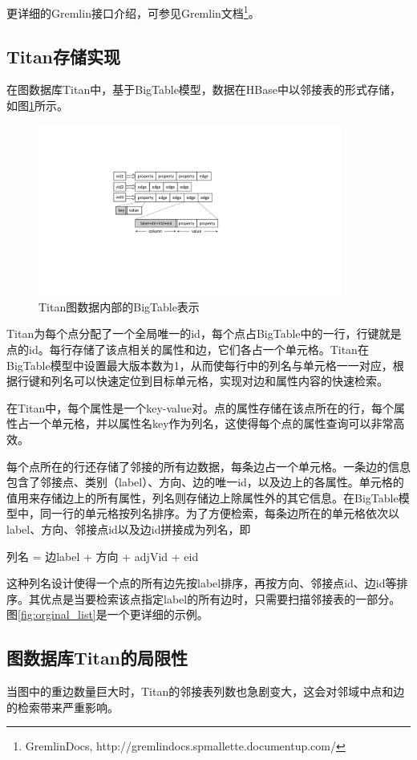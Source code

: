 更详细的Gremlin接口介绍，可参见Gremlin文档\footnote{GremlinDocs, http://gremlindocs.spmallette.documentup.com/}。

\subsection{Titan存储实现}
在图数据库Titan中，基于BigTable模型，数据在HBase中以邻接表的形式存储，如图\ref{fig:adj_list}所示。

\begin{figure}[htbp]
\centering
\includegraphics[width=100mm]{fig/adj_list.pdf}
\caption{Titan图数据内部的BigTable表示}
\label{fig:adj_list}
\end{figure}

Titan为每个点分配了一个全局唯一的id，每个点占BigTable中的一行，行键就是点的id。每行存储了该点相关的属性和边，它们各占一个单元格。Titan在BigTable模型中设置最大版本数为1，从而使每行中的列名与单元格一一对应，根据行键和列名可以快速定位到目标单元格，实现对边和属性内容的快速检索。

在Titan中，每个属性是一个key-value对。点的属性存储在该点所在的行，每个属性占一个单元格，并以属性名key作为列名，这使得每个点的属性查询可以非常高效。

每个点所在的行还存储了邻接的所有边数据，每条边占一个单元格。一条边的信息包含了邻接点、类别（label）、方向、边的唯一id，以及边上的各属性。单元格的值用来存储边上的所有属性，列名则存储边上除属性外的其它信息。在BigTable模型中，同一行的单元格按列名排序。为了方便检索，每条边所在的单元格依次以label、方向、邻接点id以及边id拼接成为列名，即
\begin{center}
  列名 = 边label + 方向 + adjVid + eid
\end{center}
这种列名设计使得一个点的所有边先按label排序，再按方向、邻接点id、边id等排序。其优点是当要检索该点指定label的所有边时，只需要扫描邻接表的一部分。图\ref{fig:orginal_list}是一个更详细的示例。

\subsection{图数据库Titan的局限性}
当图中的重边数量巨大时，Titan的邻接表列数也急剧变大，这会对邻域中点和边的检索带来严重影响。

